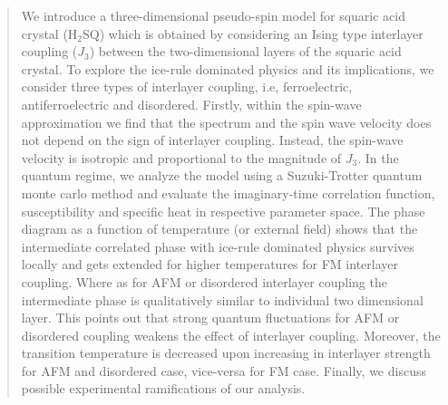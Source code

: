 \begin{abstract}
We introduce a three-dimensional pseudo-spin model for  squaric acid crystal ($\text{H}_2\text{SQ}$) which is obtained by  considering an Ising type interlayer coupling ($J_3$) between the two-dimensional layers \cite{vijigiri2018classical} of the squaric acid crystal. To explore the ice-rule dominated physics and its implications, we consider three types of interlayer coupling, i.e, ferroelectric, antiferroelectric and disordered. Firstly, within the spin-wave approximation we find that the spectrum and the spin wave velocity does not depend on the sign of interlayer coupling. Instead, the spin-wave velocity is isotropic and proportional to the magnitude of $J_3$. In the quantum regime, we analyze the model using a Suzuki-Trotter quantum monte carlo method and evaluate the imaginary-time correlation function, susceptibility and specific heat in respective parameter space. The phase diagram as a function of temperature (or external field) shows that the intermediate correlated phase with ice-rule dominated physics survives locally and gets extended for higher temperatures for FM interlayer coupling. Where as for AFM or disordered interlayer coupling the intermediate phase is qualitatively similar to individual two dimensional layer. This points out that strong quantum fluctuations for AFM or disordered coupling weakens the effect of interlayer coupling. Moreover, the transition temperature is decreased upon increasing in interlayer strength for AFM and disordered case, vice-versa for FM case. Finally, we discuss possible experimental ramifications of our analysis.
\end{abstract}


\date{\today}

\maketitle

